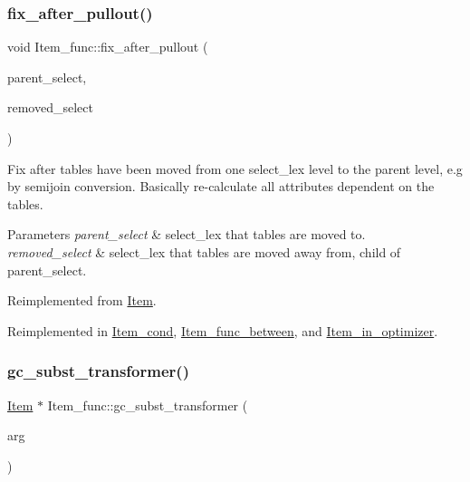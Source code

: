 \subsubsection{\texorpdfstring{fix\+\_\+after\+\_\+pullout()}{fix\_after\_pullout()}}
{\footnotesize\ttfamily void Item\+\_\+func\+::fix\+\_\+after\+\_\+pullout (\begin{DoxyParamCaption}\item[{st\+\_\+select\+\_\+lex $\ast$}]{parent\+\_\+select,  }\item[{st\+\_\+select\+\_\+lex $\ast$}]{removed\+\_\+select }\end{DoxyParamCaption})\hspace{0.3cm}{\ttfamily [virtual]}}

Fix after tables have been moved from one select\+\_\+lex level to the parent level, e.\+g by semijoin conversion. Basically re-\/calculate all attributes dependent on the tables.


\begin{DoxyParams}{Parameters}
{\em parent\+\_\+select} & select\+\_\+lex that tables are moved to. \\
\hline
{\em removed\+\_\+select} & select\+\_\+lex that tables are moved away from, child of parent\+\_\+select. \\
\hline
\end{DoxyParams}


Reimplemented from \mbox{\hyperlink{classItem_a6e3c38497d210357a4f80a755fb7b61e}{Item}}.



Reimplemented in \mbox{\hyperlink{classItem__cond_a8bef49149dce6339066280ef3a43f666}{Item\+\_\+cond}}, \mbox{\hyperlink{classItem__func__between_ade856fd17d40b1e39a2cdde5591423f3}{Item\+\_\+func\+\_\+between}}, and \mbox{\hyperlink{classItem__in__optimizer_aeac1cb56fd617d7cebee1d792b02ba1a}{Item\+\_\+in\+\_\+optimizer}}.

\mbox{\label{classItem__func_acac46454222156dbb8336cc709c6cf41}} 
\subsubsection{\texorpdfstring{gc\+\_\+subst\+\_\+transformer()}{gc\_subst\_transformer()}}
{\footnotesize\ttfamily \mbox{\hyperlink{classItem}{Item}} $\ast$ Item\+\_\+func\+::gc\+\_\+subst\+\_\+transformer (\begin{DoxyParamCaption}\item[{uchar $\ast$}]{arg }\end{DoxyParamCaption})\hspace{0.3cm}{\ttfamily [virtual]}}

